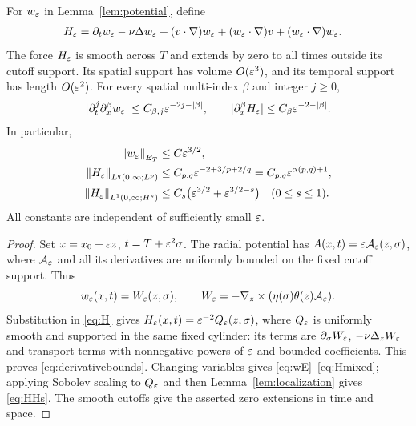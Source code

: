 \begin{lemma}\label{lem:correction}
For $w_\varepsilon$ in Lemma~\ref{lem:potential}, define
\begin{align}
 H_\varepsilon={}&\partial_tw_\varepsilon-\nu\Delta w_\varepsilon
 +(v\cdot\nabla)w_\varepsilon+(w_\varepsilon\cdot\nabla)v
 +(w_\varepsilon\cdot\nabla)w_\varepsilon.\label{eq:H}
\end{align}
The force $H_\varepsilon$ is smooth across $T$ and extends by zero to all times outside its cutoff support. Its spatial support has volume $O(\varepsilon^3)$, and its temporal support has length $O(\varepsilon^2)$. For every spatial multi-index $\beta$ and integer $j\ge0$,
\begin{equation}\label{eq:derivativebounds}
 |\partial_t^j\partial_x^\beta w_\varepsilon|
 \le C_{\beta,j}\varepsilon^{-2j-|\beta|},\qquad
 |\partial_x^\beta H_\varepsilon|
 \le C_\beta\varepsilon^{-2-|\beta|}.
\end{equation}
In particular,
\begin{align}
 \left\lVert w_\varepsilon\right\rVert_{E_T}&\le C\varepsilon^{3/2},\label{eq:wE}\\
 \left\lVert H_\varepsilon\right\rVert_{L^q(0,\infty;L^p)}
   &\le C_{p,q}\varepsilon^{-2+3/p+2/q}
     =C_{p,q}\varepsilon^{\alpha(p,q)+1},\label{eq:Hmixed}\\
 \left\lVert H_\varepsilon\right\rVert_{L^1(0,\infty;H^s)}
   &\le C_s\bigl(\varepsilon^{3/2}+\varepsilon^{3/2-s}\bigr)
       \quad(0\le s\le1).\label{eq:HHs}
\end{align}
All constants are independent of sufficiently small $\varepsilon$.
\end{lemma}
\begin{proof}
Set $x=x_0+\varepsilon z$, $t=T+\varepsilon^2\sigma$. The radial potential has
$A(x,t)=\varepsilon\mathcal A_\varepsilon(z,\sigma)$, where
$\mathcal A_\varepsilon$ and all its derivatives are uniformly bounded on the
fixed cutoff support. Thus
\[
 w_\varepsilon(x,t)=W_\varepsilon(z,\sigma),\qquad
 W_\varepsilon=-\nabla_z\times(\eta(\sigma)\theta(z)\mathcal A_\varepsilon).
\]
Substitution in \eqref{eq:H} gives $H_\varepsilon(x,t)=\varepsilon^{-2}Q_\varepsilon(z,\sigma)$,
where $Q_\varepsilon$ is uniformly smooth and supported in the same fixed cylinder:
its terms are $\partial_\sigma W_\varepsilon$, $-\nu\Delta_zW_\varepsilon$ and
transport terms with nonnegative powers of $\varepsilon$ and bounded coefficients.
This proves \eqref{eq:derivativebounds}. Changing variables gives
\eqref{eq:wE}--\eqref{eq:Hmixed}; applying Sobolev scaling to $Q_\varepsilon$
and then Lemma~\ref{lem:localization} gives \eqref{eq:HHs}.
The smooth cutoffs give the asserted zero extensions in time and space.
\end{proof}

